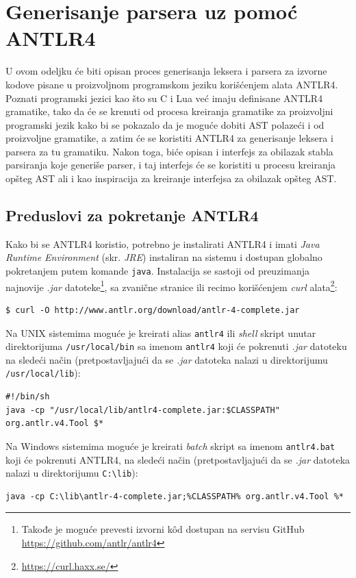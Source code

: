 \section{Generisanje parsera uz pomoć ANTLR4}
\label{sec:ANTLRParserCreation}

U ovom odeljku će biti opisan proces generisanja leksera i parsera za izvorne kodove pisane u proizvoljnom programskom jeziku korišćenjem alata ANTLR4. Poznati programski jezici kao što su C i Lua već imaju definisane ANTLR4 gramatike, tako da će se krenuti od procesa kreiranja gramatike za proizvoljni programski jezik kako bi se pokazalo da je moguće dobiti AST polazeći i od proizvoljne gramatike, a zatim će se koristiti ANTLR4 za generisanje leksera i parsera za tu gramatiku. Nakon toga, biće opisan i interfejs za obilazak stabla parsiranja koje generiše parser, i taj interfejs će se koristiti u procesu kreiranja opšteg AST ali i kao inspiracija za kreiranje interfejsa za obilazak opšteg AST.


\subsection{Preduslovi za pokretanje ANTLR4}
\label{subsec:ANTLRInstallation}

Kako bi se ANTLR4 koristio, potrebno je instalirati ANTLR4 i imati \emph{Java Runtime Environment} (skr. \emph{JRE}) instaliran na sistemu i dostupan globalno pokretanjem putem komande \texttt{java}. Instalacija se sastoji od preuzimanja najnovije \emph{.jar} datoteke\footnote{Takođe je moguće prevesti izvorni k\^od dostupan na servisu GitHub \url{https://github.com/antlr/antlr4}}, sa zvanične stranice \cite{ANTLR} ili recimo korišćenjem \emph{curl} alata\footnote{\url{https://curl.haxx.se/}}: 
\begin{lstlisting}[language={}]
$ curl -O http://www.antlr.org/download/antlr-4-complete.jar
\end{lstlisting}

Na UNIX sistemima moguće je kreirati alias \texttt{antlr4} ili \emph{shell} skript unutar direktorijuma \texttt{/usr/local/bin} sa imenom \texttt{antlr4} koji će pokrenuti \emph{.jar} datoteku na sledeći način (pretpostavljajući da se \emph{.jar} datoteka nalazi u direktorijumu \texttt{/usr/local/lib}):
\begin{lstlisting}[language={}]
#!/bin/sh
java -cp "/usr/local/lib/antlr4-complete.jar:$CLASSPATH" org.antlr.v4.Tool $*
\end{lstlisting}

Na Windows sistemima moguće je kreirati \emph{batch} skript sa imenom \texttt{antlr4.bat} koji će pokrenuti ANTLR4, na sledeći način (pretpostavljajući da se \emph{.jar} datoteka nalazi u direktorijumu \texttt{C:\textbackslash{}lib}):
\begin{lstlisting}[language={}]
java -cp C:\lib\antlr-4-complete.jar;%CLASSPATH% org.antlr.v4.Tool %*
\end{lstlisting}

